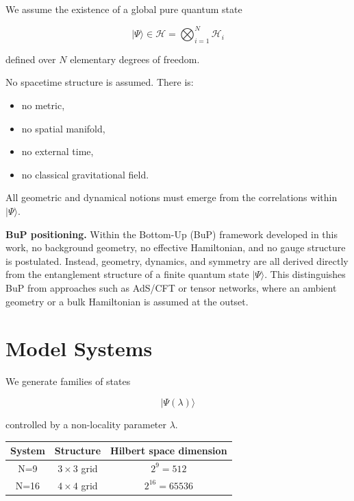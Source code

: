 \documentclass[11pt]{article}
\begin{document}
We assume the existence of a global pure quantum state

\[
|\Psi\rangle \in \mathcal{H} = \bigotimes_{i=1}^{N} \mathcal{H}_i
\]

defined over $N$ elementary degrees of freedom.

No spacetime structure is assumed. There is:

\begin{itemize}
\item no metric,
\item no spatial manifold,
\item no external time,
\item no classical gravitational field.
\end{itemize}

All geometric and dynamical notions must emerge from the correlations
within $|\Psi\rangle$.

\medskip
\noindent\textbf{BuP positioning.}
Within the Bottom-Up (BuP) framework developed in this work,
no background geometry, no effective Hamiltonian, and no gauge
structure is postulated. Instead, geometry, dynamics, and symmetry
are all derived directly from the entanglement structure of a finite
quantum state $|\Psi\rangle$. This distinguishes BuP from approaches
such as AdS/CFT or tensor networks, where an ambient geometry or
a bulk Hamiltonian is assumed at the outset.

\section{Model Systems}

We generate families of states

\[
|\Psi(\lambda)\rangle
\]

controlled by a non-locality parameter $\lambda$.

\begin{center}
\begin{tabular}{ccc}
\toprule
System & Structure & Hilbert space dimension \\
\midrule
N=9  & $3\times3$ grid & $2^9=512$ \\
N=16 & $4\times4$ grid & $2^{16}=65536$ \\
\bottomrule
\end{tabular}
\end{center}

\end{document}
